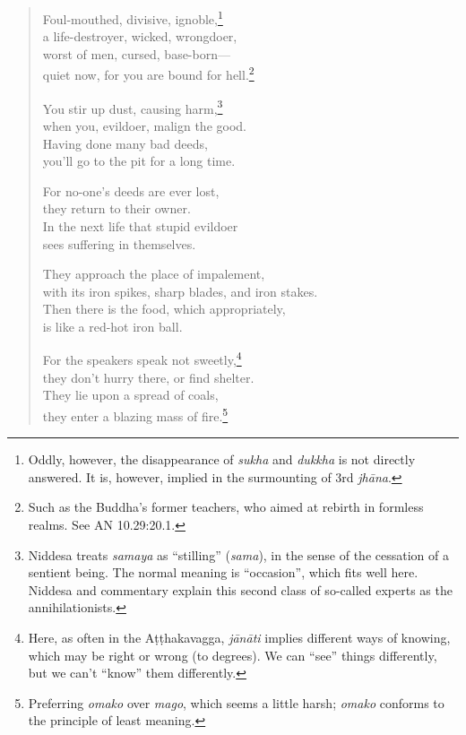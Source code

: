 \documentclass[12pt,openany]{book}%
\begin{document}
\begin{verse}
Foul-mouthed, divisive, ignoble,\footnote{Oddly, however, the disappearance of \textit{sukha} and \textit{dukkha} is not directly answered. It is, however, implied in the surmounting of 3rd \textit{\textsanskrit{jhāna}}. } \\
a life-destroyer, wicked, wrongdoer, \\
worst of men, cursed, base-born—\\
quiet now, for you are bound for hell.\footnote{Such as the Buddha’s former teachers, who aimed at rebirth in formless realms. See AN 10.29:20.1. } 

You stir up dust, causing harm,\footnote{Niddesa treats \textit{samaya} as “stilling” (\textit{sama}), in the sense of the cessation of a sentient being. The normal meaning is “occasion”, which fits well here. Niddesa and commentary explain this second class of so-called experts as the annihilationists. } \\
when you, evildoer, malign the good. \\
Having done many bad deeds, \\
you’ll go to the pit for a long time. 

For no-one’s deeds are ever lost, \\
they return to their owner. \\
In the next life that stupid evildoer \\
sees suffering in themselves. 

They approach the place of impalement, \\
with its iron spikes, sharp blades, and iron stakes. \\
Then there is the food, which appropriately, \\
is like a red-hot iron ball. 

For the speakers speak not sweetly,\footnote{Here, as often in the \textsanskrit{Aṭṭhakavagga}, \textit{\textsanskrit{jānāti}} implies different ways of knowing, which may be right or wrong (to degrees). We can “see” things differently, but we can’t “know” them differently. } \\
they don’t hurry there, or find shelter. \\
They lie upon a spread of coals, \\
they enter a blazing mass of fire.\footnote{Preferring \textit{omako} over \textit{mago}, which seems a little harsh; \textit{omako} conforms to the principle of least meaning. } 


\end{verse}
\end{document}

